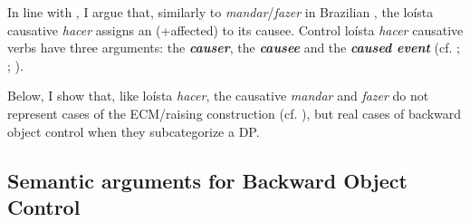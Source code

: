 \documentclass[output=paper]{langsci/langscibook}
\begin{document}
In line with \citet{López2001}, I argue that, similarly to \textit{mandar}/\textit{fazer} in Brazilian , the loísta causative \textit{hacer} assigns an (+affected)  to its causee. Control loísta \textit{hacer} causative verbs have three arguments: the \textbf{\textit{causer}}, the \textbf{\textit{causee} }and the \textbf{\textit{caused event}} (cf. \citealt{Zubizarreta1985}; \citealt{Alsina1992}; \citealt{Ippolito2000}). 

Below, I show that, like loísta \textit{hacer}, the causative \textit{mandar} and \textit{fazer} do not represent cases of the ECM\slash raising construction (cf. \citealt{Farrell1995}), but real cases of backward object control when they subcategorize a DP.

\subsection{Semantic arguments for Backward Object Control} %
\end{document}
